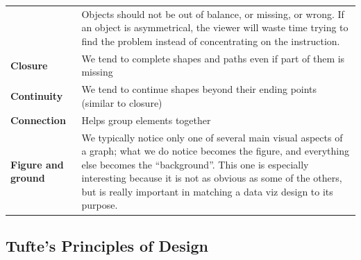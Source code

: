 \documentclass[]{book}
\begin{document}
\begin{longtable}[]{@{}ll@{}}
\begin{minipage}[t]{0.16\columnwidth}
\end{minipage} & \begin{minipage}[t]{0.78\columnwidth}\raggedright\strut
Objects should not be out of balance, or missing, or wrong. If an object
is asymmetrical, the viewer will waste time trying to find the problem
instead of concentrating on the instruction.\strut
\end{minipage}\tabularnewline
\begin{minipage}[t]{0.16\columnwidth}\raggedright\strut
\textbf{Closure}\strut
\end{minipage} & \begin{minipage}[t]{0.78\columnwidth}\raggedright\strut
We tend to complete shapes and paths even if part of them is
missing\strut
\end{minipage}\tabularnewline
\begin{minipage}[t]{0.16\columnwidth}\raggedright\strut
\textbf{Continuity}\strut
\end{minipage} & \begin{minipage}[t]{0.78\columnwidth}\raggedright\strut
We tend to continue shapes beyond their ending points (similar to
closure)\strut
\end{minipage}\tabularnewline
\begin{minipage}[t]{0.16\columnwidth}\raggedright\strut
\textbf{Connection}\strut
\end{minipage} & \begin{minipage}[t]{0.78\columnwidth}\raggedright\strut
Helps group elements together\strut
\end{minipage}\tabularnewline
\begin{minipage}[t]{0.16\columnwidth}\raggedright\strut
\textbf{Figure and ground}\strut
\end{minipage} & \begin{minipage}[t]{0.78\columnwidth}\raggedright\strut
We typically notice only one of several main visual aspects of a graph;
what we do notice becomes the figure, and everything else becomes the
``background''. This one is especially interesting because it is not as
obvious as some of the others, but is really important in matching a
data viz design to its purpose.\strut
\end{minipage}\tabularnewline
\bottomrule
\end{longtable}

\subsection{Tufte's Principles of
Design}\label{tuftes-principles-of-design}
\end{document}
